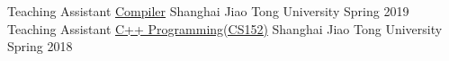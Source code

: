 \begin{cventries}

    \cventry
    {Teaching Assistant}
	{\href{https://acm.sjtu.edu.cn/wiki/Compiler_2019}{Compiler}}
	{Shanghai Jiao Tong University}
	{Spring 2019}
	{
    }
    \vspace{-6pt}
    \cventry
    {Teaching Assistant}
	{\href{https://acm.sjtu.edu.cn/wiki/Programming_2017}{C++ Programming(CS152)}}
	{Shanghai Jiao Tong University}
	{Spring 2018}
	{
    }
    \vspace{-18pt}
\end{cventries}